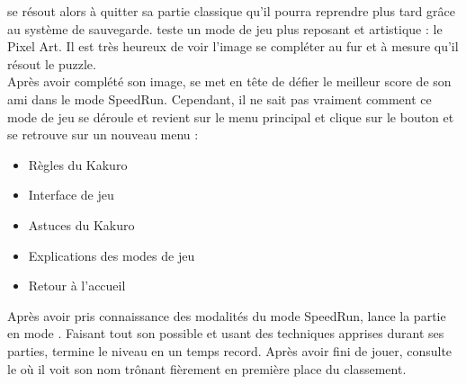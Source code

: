\begin{mdframed}
    \perso se résout alors à quitter sa partie classique qu'il pourra reprendre plus tard grâce au système de sauvegarde. \perso teste un mode de jeu plus reposant et artistique : le Pixel Art. Il est très heureux de voir l'image se compléter au fur et à mesure qu'il résout le puzzle.\\

    

    Après avoir complété son image, \perso se met en tête de défier le meilleur score de son ami dans le mode SpeedRun. Cependant, il ne sait pas vraiment comment ce mode de jeu se déroule et revient sur le menu principal et clique sur le bouton  et se retrouve sur un nouveau menu :
     \begin{itemize}
         \item Règles du Kakuro
         \item Interface de jeu
         \item Astuces du Kakuro
         \item Explications des modes de jeu
         \item Retour à l'accueil
     \end{itemize}
     Après avoir pris connaissance des modalités du mode SpeedRun, \perso lance la partie en mode . Faisant tout son possible et usant des techniques apprises durant ses parties, \perso termine le niveau en un temps record. Après avoir fini de jouer, \perso consulte le  où il voit son nom trônant fièrement en première place du classement.
\end{mdframed}